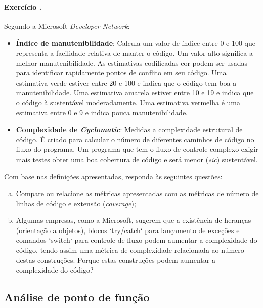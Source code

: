 \paragraph{Exercício \exno.} Segundo a Microsoft {\em Developer Network}:

\begin{itemize}
\item {\bf Índice de manutenibilidade}: Calcula um valor de índice
  entre 0 e 100 que representa a facilidade relativa de manter o
  código. Um valor alto significa a melhor manutenibilidade. As
  estimativas codificadas cor podem ser usadas para identificar
  rapidamente pontos de conflito em seu código. Uma estimativa verde
  estiver entre 20 e 100 e indica que o código tem boa a
  manutenibilidade. Uma estimativa amarela estiver entre 10 e 19 e
  indica que o código à sustentável moderadamente. Uma estimativa
  vermelha é uma estimativa entre 0 e 9 e indica pouca
  manutenibilidade.

 \item {\bf Complexidade de {\em Cyclomatic}}: Medidas a complexidade
   estrutural de código. É criado para calcular o número de diferentes
   caminhos de código no fluxo do programa. Um programa que tem o
   fluxo de controle complexo exigir mais testes obter uma boa
   cobertura de código e será menor ({\em sic}) sustentável.
\end{itemize}

Com base nas definições apresentadas, responda às seguintes questões:

\begin{enumerate}[a)]
\item Compare ou relacione as métricas apresentadas com
  as métricas de número de linhas de código e extensão ({\em coverage});


\item Algumas empresas, como a Microsoft, sugerem que a
  existência de heranças (orientação a objetos), blocos `try/catch`
  para lançamento de exceções e comandos `switch` para controle de
  fluxo podem aumentar a complexidade do código, tendo assim uma
  métrica de complexidade relacionada ao número destas
  construções. Porque estas construções podem aumentar a complexidade
  do código?
\end{enumerate}

\subsection*{Análise de ponto de função}

